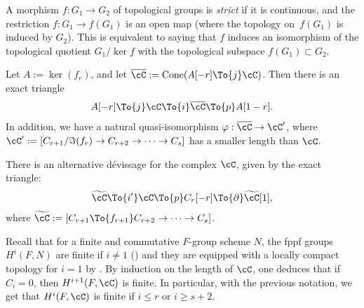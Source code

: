 \begin{defi}
A morphism $f: G_1 \to G_2$
of topological groups is \emph{strict} if it is continuous, and
the restriction $f: G_1 \to f(G_1)$ is
an open map (where the topology on~$f(G_1)$ is induced by $G_2$). This is
equivalent to saying that $f$ induces an isomorphism of the topological
quotient $G_1/\ker f$ with the topological subspace $f(G_1) \subset G_2$.
\end{defi}

Let $A:= \ker(f_r)$, and let $\overline{\cC}:= \textup{Cone}(A[-r] \To{j} \cC)$. Then there is an exact triangle%
\begin{equation} \label{devissage complexe}
A[-r] \To{j} \cC \To{i} \overline{\cC} \To{p} A[1-r].
\end{equation}
In addition, we have a natural quasi-isomorphism $\varphi: \overline{\cC} \to \cC'$, where $\cC':= [C_{r+1}/\Im (f_r) \to C_{r+2} \to \cdots\to C_s]$ has a smaller length than $\cC$.

There is an alternative dévissage for the complex $\cC$, given by
the exact triangle:
\begin{equation} \label{devissage complexe bis}
\widetilde{\cC} \To{i'} \cC \To{p} C_r[-r] \To{\partial} \widetilde{\cC}[1],
\end{equation}
where $\widetilde{\cC}:= [C_{r+1} \To{f_{r+1}} C_{r+2} \to \cdots\to C_s]$.

Recall that for a finite and commutative $F$-group scheme $N$, the fppf groups
$H^i(F,N)$ are finite if $i \neq 1$ (\cite[\S III.6]{MilADT}) and they are
equipped with a locally compact topology for $i=1$ by \cite{Ces}.
By induction on the length of $\cC$, one deduces that if $C_i = 0$, then $H^{i+1}(F, \cC)$ is finite. In particular, with the previous notation, we get that $H^i(F, \cC)$ is finite if $i \leq r$ or $i \geq s+2$.

